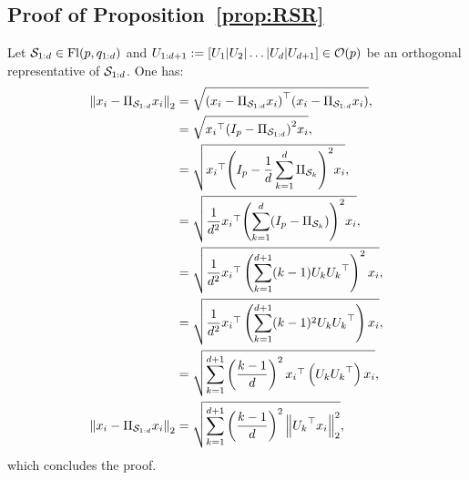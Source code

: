 \subsection{Proof of Proposition~\ref{prop:RSR}}
Let $\mathcal{S}_{1:d} \in \operatorname{Fl}(p, q_{1:d})$ and $U_{1:d+1} := [U_1|U_2|\dots|U_d|U_{d+1}] \in \mathcal{O}(p)$ be an orthogonal representative of $\mathcal{S}_{1:d}$. One has:
\begin{align}
	\left\lVert x_i - \Pi_{\mathcal{S}_{1:d}} x_i\right\rVert_2 &= \sqrt{{(x_i - \Pi_{\mathcal{S}_{1:d}} x_i)}^\top (x_i - \Pi_{\mathcal{S}_{1:d}} x_i)},\\
	 &= \sqrt{{x_i}^\top {(I_p - \Pi_{\mathcal{S}_{1:d}})}^2 x_i},\\
	 &= \sqrt{{x_i}^\top {\left(I_p - \frac1d \sum_{k=1}^d\Pi_{\mathcal{S}_k}\right)}^2 x_i},\\
 	 &= \sqrt{\frac1{d^2} {x_i}^\top {\left(\sum_{k=1}^d (I_p - \Pi_{\mathcal{S}_k})\right)}^2 x_i},\\
 	 &= \sqrt{\frac1{d^2} {x_i}^\top \left(\sum_{k=1}^{d+1} (k-1) U_k {U_k}^\top\right)^2  x_i},\\
 	 &= \sqrt{\frac1{d^2} {x_i}^\top \left(\sum_{k=1}^{d+1} (k-1)^2 U_k {U_k}^\top\right)  x_i},\\
 	 &= \sqrt{\sum_{k=1}^{d+1} \left(\frac {k-1} {d}\right)^2 {x_i}^\top \left( U_k {U_k}^\top\right)  x_i},\\
  	 \left\lVert x_i - \Pi_{\mathcal{S}_{1:d}} x_i\right\rVert_2 &= \sqrt{\sum_{k=1}^{d+1} \left(\frac {k-1} {d}\right)^2 \left\lVert{U_k}^\top x_i\right\rVert_2^2},
\end{align}
which concludes the proof.
